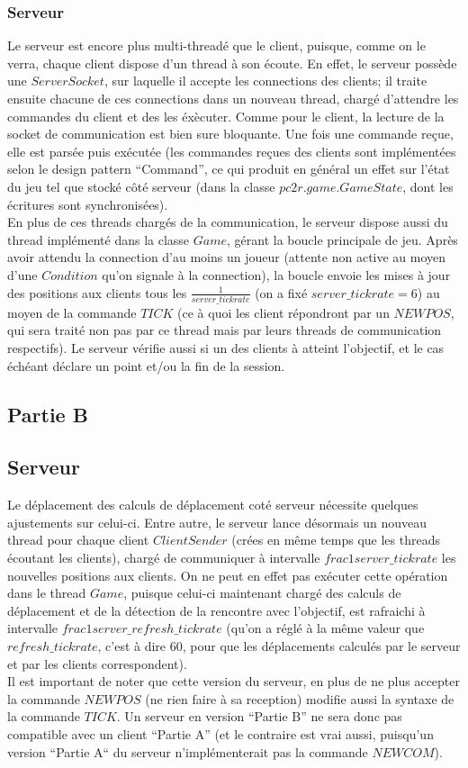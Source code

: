 \documentclass{article}
\begin{document}
\subsubsection{Serveur}
Le serveur est encore plus multi-threadé que le client, puisque, comme on le verra, chaque client dispose d'un thread à son écoute. En effet, le serveur possède une $ServerSocket$, sur laquelle il accepte les connections des clients; il traite ensuite chacune de ces connections dans un nouveau thread, chargé d'attendre les commandes du client et des les éxècuter. Comme pour le client, la lecture de la socket de communication est bien sure bloquante. Une fois une commande reçue, elle est parsée puis exécutée (les commandes reçues des clients sont implémentées selon le design pattern ``Command'', ce qui produit en général un effet sur l'état du jeu tel que stocké côté serveur (dans la classe $pc2r.game.GameState$, dont les écritures sont synchronisées).\\
En plus de ces threads chargés de la communication, le serveur dispose aussi du thread implémenté dans la classe $Game$, gérant la boucle principale de jeu. Après avoir attendu la connection d'au moins un joueur (attente non active au moyen d'une $Condition$ qu'on signale à la connection), la boucle envoie les mises à jour des positions aux clients tous les $\frac{1}{server\_tickrate}$ (on a fixé $server\_tickrate = 6$) au moyen de la commande $TICK$ (ce à quoi les client répondront par un $NEWPOS$, qui sera traité non pas par ce thread mais par leurs threads de communication respectifs). Le serveur vérifie aussi si un des clients à atteint l'objectif, et le cas échéant déclare un point et/ou la fin de la session.

\subsection{Partie B}

\subsection{Serveur}
Le déplacement des calculs de déplacement coté serveur nécessite quelques ajustements sur celui-ci. Entre autre, le serveur lance désormais un nouveau thread pour chaque client $ClientSender$ (crées en même temps que les threads écoutant les clients), chargé de communiquer à intervalle $frac{1}{server\_tickrate}$ les nouvelles positions aux clients. On ne peut en effet pas exécuter cette opération dans le thread $Game$, puisque celui-ci maintenant chargé des calculs de déplacement et de la détection de la rencontre avec l'objectif, est rafraichi à intervalle $frac{1}{server\_refresh\_tickrate}$ (qu'on a réglé à la même valeur que $refresh\_tickrate$, c'est à dire $60$, pour que les déplacements calculés par le serveur et par les clients correspondent).\\
Il est important de noter que cette version du serveur, en plus de ne plus accepter la commande $NEWPOS$ (ne rien faire à sa reception) modifie aussi la syntaxe de la commande $TICK$. Un serveur en version ``Partie B'' ne sera donc pas compatible avec un client ``Partie A'' (et le contraire est vrai aussi, puisqu'un version ``Partie A`` du serveur n'implémenterait pas la commande $NEWCOM$).
\end{document}
